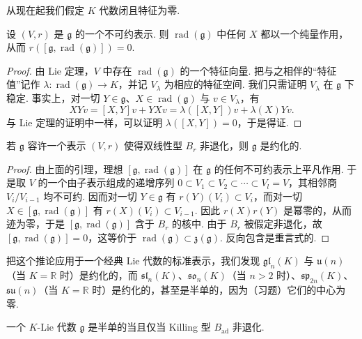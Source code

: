 \begin{numpara}\label{np:lie-2-4-2}
从现在起我们假定 $K$ 代数闭且特征为零.
\begin{lemma*}
设 $(V,r)$ 是 $\mathfrak g$ 的一个不可约表示. 则 $\operatorname{rad}(\mathfrak g)$ 中任何 $X$ 都以一个纯量作用，从而 $r([\mathfrak g,\operatorname{rad}(\mathfrak g)])=0$.
\end{lemma*}
\begin{proof}
由 Lie 定理，$V$ 中存在 $\operatorname{rad}(\mathfrak g)$ 的一个特征向量. 把与之相伴的``特征值''记作 $\lambda:\operatorname{rad}(\mathfrak g)\longrightarrow K$，并记 $V_{\lambda}$ 为相应的特征空间. 我们只需证明 $V_{\lambda}$ 在 $\mathfrak g$ 下稳定. 事实上，对一切 $Y\in\mathfrak g$、$X\in\operatorname{rad}(\mathfrak g)$ 与 $v\in V_{\lambda}$，有
\[
XYv=[X,Y]v+YXv=\lambda([X,Y])v+\lambda(X)Yv.
\]
与 Lie 定理的证明中一样，可以证明 $\lambda([X,Y])=0$，于是得证.
\end{proof}
\begin{corollary*}
若 $\mathfrak g$ 容许一个表示 $(V,r)$ 使得双线性型 $B_{r}$ 非退化，则 $\mathfrak g$ 是约化的.
\end{corollary*}
\begin{proof}
由上面的引理，理想 $[\mathfrak g,\operatorname{rad}(\mathfrak g)]$ 在 $\mathfrak g$ 的任何不可约表示上平凡作用. 于是取 $V$ 的一个由子表示组成的递增序列 $0\subset V_{1}\subset V_{2}\subset\cdots\subset V_{l}=V$，其相邻商 $V_{i}/V_{i-1}$ 均不可约. 因而对一切 $Y\in\mathfrak g$ 有 $r(Y)(V_{i})\subset V_{i}$，而对一切 $X\in[\mathfrak g,\operatorname{rad}(\mathfrak g)]$ 有 $r(X)(V_{i})\subset V_{i-1}$. 因此 $r(X)r(Y)$ 是幂零的，从而迹为零，于是 $[\mathfrak g,\operatorname{rad}(\mathfrak g)]$ 含于 $B_{r}$ 的核中. 由于 $B_{r}$ 被假定非退化，故 $[\mathfrak g,\operatorname{rad}(\mathfrak g)]=0$，这等价于 $\operatorname{rad}(\mathfrak g)\subset\mathfrak z(\mathfrak g)$. 反向包含是重言式的.
\end{proof}
\begin{example*}
把这个推论应用于一个经典 Lie 代数的标准表示，我们发现 $\mathfrak{gl}_n(K)$ 与 $\mathfrak u(n)$（当 $K=\mathbb R$ 时）是约化的，而 $\mathfrak{sl}_n(K)$、$\mathfrak{so}_n(K)$（当 $n>2$ 时）、$\mathfrak{sp}_{2n}(K)$、$\mathfrak{su}(n)$（当 $K=\mathbb R$ 时）是约化的，甚至是半单的，因为（习题）它们的中心为零.
\end{example*}
\begin{theorem*}[Cartan]
一个 $K$-Lie 代数 $\mathfrak g$ 是半单的当且仅当 Killing 型 $B_{\mathrm{ad}}$ 非退化.
\end{theorem*}

\end{numpara}
